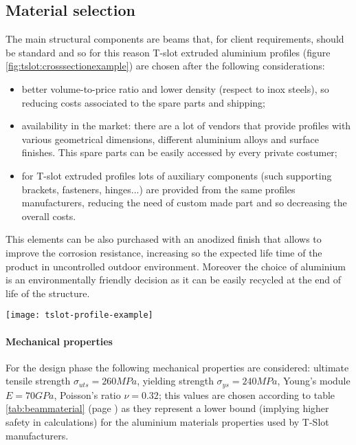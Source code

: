 \subsection{Material selection}
	
	The main structural components are beams that, for client requirements, should be standard and so for this reason T-slot extruded aluminium profiles (figure \ref{fig:tslot:crosssectionexample}) are chosen after the following considerations:
	\begin{itemize}
		\item better volume-to-price ratio and lower density (respect to inox steels), so reducing costs associated to the spare parts and shipping;
		\item availability in the market: there are a lot of vendors that provide profiles with various geometrical dimensions, different aluminium alloys and surface finishes. This spare parts can be easily accessed by every private costumer;
		\item for T-slot extruded profiles lots of auxiliary components (such supporting brackets, fasteners, hinges...)  are provided from the same profiles manufacturers, reducing the need of custom made part and so decreasing the overall costs.
	\end{itemize}

	This elements can be also purchased with an anodized finish that allows to improve the corrosion resistance, increasing so the expected life time of the product in uncontrolled outdoor environment. Moreover the choice of aluminium is an environmentally friendly decision as it can be easily recycled at the end of life of the structure.
	
	\begin{SCfigure}[1.5][bh]
		\centering\texttt{[image: tslot-profile-example]}
		\caption{technical drawing of a T-slot profile's cross-section. The particular sketch represent the model \texttt{TS40-40LM} by Tslots \cite{tslot-ds}.}
		\label{fig:tslot:crosssectionexample}
	\end{SCfigure}
	
	\paragraph{Mechanical properties} For the design phase the following mechanical properties are considered: ultimate tensile strength $\sigma_{uts} = 260 MPa$, yielding strength $\sigma_{ys} = 240 MPa$, Young's module $E = 70 GPa$, Poisson's ratio $\nu = 0.32$; this values are chosen according to table \ref{tab:beammaterial} (page \pageref{tab:beammaterial}) as  they represent a lower bound (implying higher safety in calculations) for the aluminium materials properties used by T-Slot manufacturers.
	
	
	
		
	
	
	
	
	
	
	
	
	
	
	
	
	